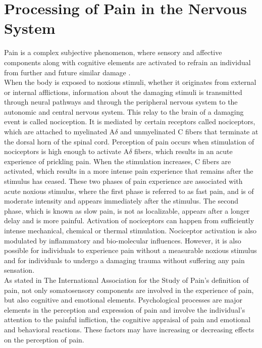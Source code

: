 \section{Processing of Pain in the Nervous System} \label{sec:pain}

Pain is a complex subjective phenomenon, where sensory and affective components along with cognitive elements are activated to refrain an individual from further and future similar damage \cite{Davis2017}. \\
When the body is exposed to noxious stimuli, whether it originates from external or internal afflictions, information about the damaging stimuli is transmitted through neural pathways and through the peripheral nervous system to the autonomic and central nervous system. This relay to the brain of a damaging event is called nociception. It is mediated by certain receptors called nociceptors, which are attached to myelinated A$\delta$ and unmyelinated C fibers that terminate at the dorsal horn of the spinal cord. Perception of pain occurs when stimulation of nociceptors is high enough to activate A$\delta$ fibers, which results in an acute experience of prickling pain. When the stimulation increases, C fibers are activated, which results in a more intense pain experience that remains after the stimulus has ceased. These two phases of pain experience are associated with acute noxious stimulus, where the first phase is referred to as fast pain, and is of moderate intensity and appears immediately after the stimulus. The second phase, which is known as slow pain, is not as localizable, appears after a longer delay and is more painful. Activation of nociceptors can happen from sufficiently intense mechanical, chemical or thermal stimulation. Nociceptor activation is also modulated by inflammatory and bio-molecular influences. However, it is also possible for individuals to experience pain without a measurable noxious stimulus and for individuals to undergo a damaging trauma without suffering any pain sensation. \cite{Garland2013} \\ 
As stated in The International Association for the Study of Pain’s definition of pain, not only somatosensory components are involved in the experience of pain, but also cognitive and emotional elements. Psychological processes are major elements in the perception and expression of pain and involve the individual’s attention to the painful infliction, the cognitive appraisal of pain and emotional and behavioral reactions. These factors may have increasing or decreasing effects on the perception of pain. \\
